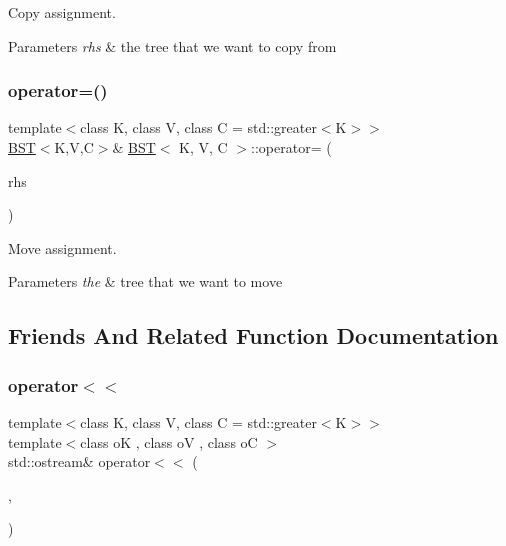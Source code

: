 Copy assignment. 


\begin{DoxyParams}{Parameters}
{\em rhs} & the tree that we want to copy from \\
\hline
\end{DoxyParams}
\mbox{\label{classBST_a487925834a1291eec64d6efac4fb9fab}} 
\subsubsection{\texorpdfstring{operator=()}{operator=()}\hspace{0.1cm}{\footnotesize\ttfamily [2/2]}}
{\footnotesize\ttfamily template$<$class K, class V, class C = std\+::greater$<$\+K$>$$>$ \\
\hyperlink{classBST}{B\+ST}$<$K,V,C$>$\& \hyperlink{classBST}{B\+ST}$<$ K, V, C $>$\+::operator= (\begin{DoxyParamCaption}\item[{const \hyperlink{classBST}{B\+ST}$<$ K, V, C $>$ \&\&}]{rhs }\end{DoxyParamCaption})\hspace{0.3cm}{\ttfamily [inline]}}



Move assignment. 


\begin{DoxyParams}{Parameters}
{\em the} & tree that we want to move \\
\hline
\end{DoxyParams}


\subsection{Friends And Related Function Documentation}
\mbox{\label{classBST_abf0033be2689fd4cfbeee149b114536b}} 
\subsubsection{\texorpdfstring{operator$<$$<$}{operator<<}}
{\footnotesize\ttfamily template$<$class K, class V, class C = std\+::greater$<$\+K$>$$>$ \\
template$<$class oK , class oV , class oC $>$ \\
std\+::ostream\& operator$<$$<$ (\begin{DoxyParamCaption}\item[{std\+::ostream \&}]{,  }\item[{const \hyperlink{classBST}{B\+ST}$<$ oK, oV, oC $>$ \&}]{ }\end{DoxyParamCaption})\hspace{0.3cm}{\ttfamily [friend]}}



